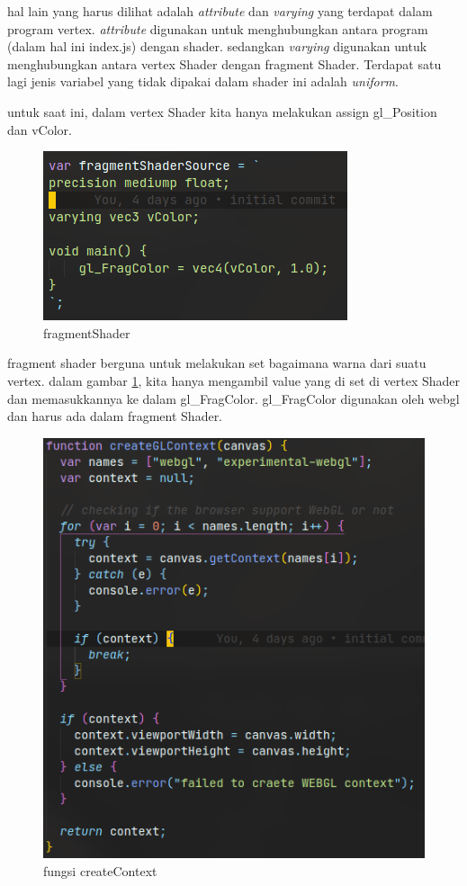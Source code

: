 hal lain yang harus dilihat adalah \emph{attribute} dan \emph{varying} yang terdapat dalam program vertex.
\emph{attribute} digunakan untuk menghubungkan antara program (dalam hal ini index.js) dengan shader. sedangkan
\emph{varying} digunakan untuk menghubungkan antara vertex Shader dengan fragment Shader. Terdapat satu lagi jenis variabel
yang tidak dipakai dalam shader ini adalah \emph{uniform}.

untuk saat ini, dalam vertex Shader kita hanya melakukan assign gl\_Position dan vColor.

\begin{figure}[h]
    \centering
    \includegraphics{grafika/fragment shader.png}
    \caption{fragmentShader}
    \label{fig: fragmentShader}
\end{figure}

fragment shader berguna untuk melakukan set bagaimana warna dari suatu vertex.
dalam gambar \ref{fig: fragmentShader}, kita hanya mengambil value yang di set di vertex Shader dan memasukkannya ke dalam gl\_FragColor.
gl\_FragColor digunakan oleh webgl dan harus ada dalam fragment Shader.


\begin{figure}[h]
    \centering
    \includegraphics{grafika/createContext.png}
    \caption{fungsi createContext}
    \label{fig: createContext}
\end{figure}


